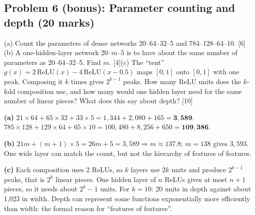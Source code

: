 \documentclass[11pt]{article}
\begin{document}
\subsection{Problem 6 (bonus): Parameter counting and depth \normalfont\small\color{GreyN}(20 marks)}

\begin{prob}(a) Count the parameters of dense networks 20--64--32--5 and 784--128--64--10. [6]\newline (b) A one-hidden-layer network 20--$m$--5 is to have about the same number of parameters as 20--64--32--5. Find $m$. [4]\newline (c) The ``tent'' $g(x)=2\,\text{ReLU}(x)-4\,\text{ReLU}(x-0.5)$ maps $[0,1]$ onto $[0,1]$ with one peak. Composing it $k$ times gives $2^{k-1}$ peaks. How many ReLU units does the $k$-fold composition use, and how many would one hidden layer need for the same number of linear pieces? What does this say about depth? [10]\end{prob}

\begin{soln}\textbf{(a)} $21\times64+65\times32+33\times5=1{,}344+2{,}080+165=\mathbf{3{,}589}$. $785\times128+129\times64+65\times10=100{,}480+8{,}256+650=\mathbf{109{,}386}$.

\textbf{(b)} $21m+(m+1)\times5=26m+5=3{,}589\Rightarrow m\approx137.8$; $m=138$ gives $3{,}593$. One wide layer can match the count, but not the hierarchy of features of features.

\textbf{(c)} Each composition uses 2 ReLUs, so $k$ layers use $2k$ units and produce $2^{k-1}$ peaks, that is $2^k$ linear pieces. One hidden layer of $n$ ReLUs gives at most $n+1$ pieces, so it needs about $2^k-1$ units. For $k=10$: 20 units in depth against about 1,023 in width. Depth can represent some functions exponentially more efficiently than width: the formal reason for ``features of features''.\end{soln}
\end{document}
